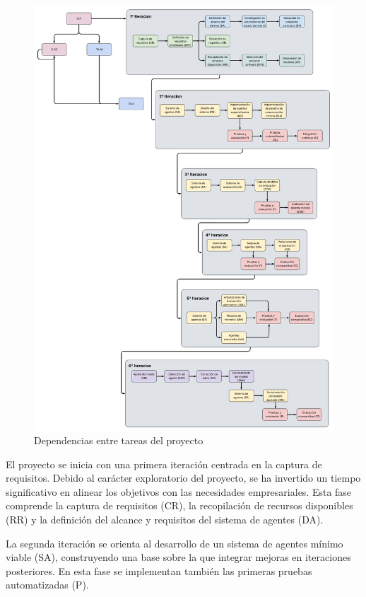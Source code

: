 \begin{figure}[h]
  \centering
  \includegraphics[scale=0.15]{figures/dependencias_2.png}%
  \caption{Dependencias entre tareas del proyecto}
  \label{fig:dependencias}
\end{figure}

El proyecto se inicia con una primera iteración centrada en la captura de requisitos. Debido al carácter exploratorio del proyecto, se ha invertido un tiempo significativo en alinear los objetivos con las necesidades empresariales. Esta fase comprende la captura de requisitos (CR), la recopilación de recursos disponibles (RR) y la definición del alcance y requisitos del sistema de agentes (DA).

La segunda iteración se orienta al desarrollo de un sistema de agentes mínimo viable (SA), construyendo una base sobre la que integrar mejoras en iteraciones posteriores. En esta fase se implementan también las primeras pruebas automatizadas (P).

